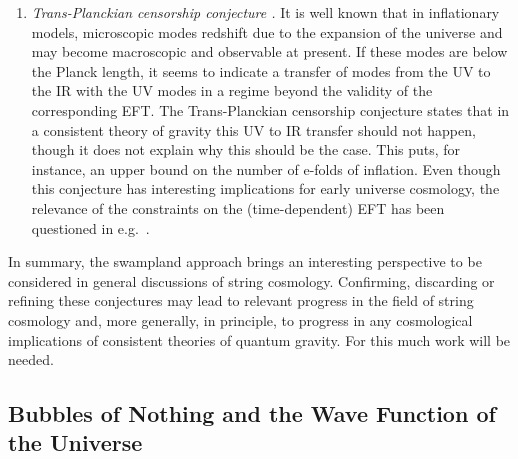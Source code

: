 \begin{enumerate}
\item{\it Trans-Planckian censorship conjecture \cite{Bedroya:2019snp,Bedroya:2019tba}.}  It is well known that in inflationary models, microscopic modes redshift due to the expansion of the universe and may become macroscopic and observable at present. If these modes are below the Planck length, it seems to indicate a transfer of modes from the UV to the IR with the UV modes in a regime beyond the validity of the corresponding EFT. The Trans-Planckian censorship conjecture states that in a consistent theory of gravity this UV to IR transfer should not happen, though it does not explain why this should be the case. This puts, for instance, an upper bound on the number of e-folds of inflation. Even though this conjecture has interesting implications for early universe cosmology, the relevance of the constraints on the (time-dependent)  EFT has been questioned in e.g.~\cite{Kaloper:2018zgi,Dvali:2020cgt,Burgess:2020nec,Komissarov:2022gax, Lacombe:2023qfx}.


\end{enumerate}
In summary, the swampland approach brings an interesting perspective to be considered in general discussions of string cosmology. Confirming, discarding or refining these conjectures may lead to relevant progress in the field of string cosmology and, more generally, in principle, to progress in any cosmological implications of consistent theories of quantum gravity. For this much work will be needed.

\subsection{Bubbles of Nothing and the Wave Function of the Universe}

